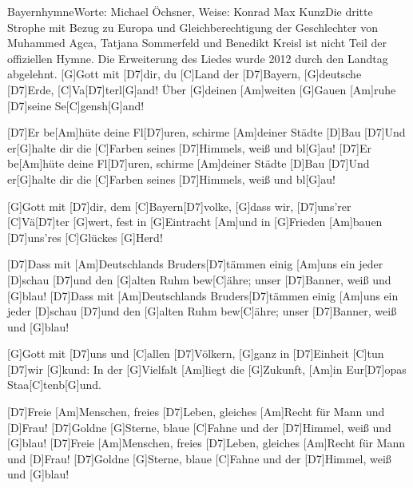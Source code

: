 \documentclass[../main.tex]{subfiles}
\begin{document}
\begin{song}[2]{Bayernhymne}{Worte:  Michael Öchsner, Weise: Konrad Max Kunz}{Die dritte Strophe mit Bezug zu Europa und Gleichberechtigung der Geschlechter von Muhammed Agca, Tatjana Sommerfeld und Benedikt Kreisl ist nicht Teil der offiziellen Hymne. Die Erweiterung des Liedes wurde 2012 durch den Landtag abgelehnt.}
[G]Gott mit [D7]dir, du [C]Land der [D7]Bayern, [G]deutsche [D7]Erde, [C]Va[D7]terl[G]and!
Über [G]deinen [Am]weiten [G]Gauen [Am]ruhe [D7]seine Se[C]gensh[G]and!

[D7]Er be[Am]hüte deine Fl[D7]uren, schirme [Am]deiner Städte [D]Bau
[D7]Und er[G]halte dir die [C]Farben seines [D7]Himmels, weiß und bl[G]au!
[D7]Er be[Am]hüte deine Fl[D7]uren, schirme [Am]deiner Städte [D]Bau
[D7]Und er[G]halte dir die [C]Farben seines [D7]Himmels, weiß und bl[G]au!

[G]Gott mit [D7]dir, dem [C]Bayern[D7]volke, [G]dass wir, [D7]uns'rer [C]Vä[D7]ter [G]wert,
fest in [G]Eintracht [Am]und in [G]Frieden [Am]bauen [D7]uns'res [C]Glückes [G]Herd!

[D7]Dass mit [Am]Deutschlands Bruders[D7]tämmen einig [Am]uns ein jeder [D]schau
[D7]und den [G]alten Ruhm bew[C]{ä}hre; unser [D7]Banner, weiß und [G]blau!
[D7]Dass mit [Am]Deutschlands Bruders[D7]tämmen einig [Am]uns ein jeder [D]schau
[D7]und den [G]alten Ruhm bew[C]{ä}hre; unser [D7]Banner, weiß und [G]blau!

[G]Gott mit [D7]uns und [C]allen [D7]Völkern, [G]ganz in [D7]Einheit [C]tun [D7]wir [G]kund:
In der [G]Vielfalt [Am]liegt die [G]Zukunft, [Am]in Eur[D7]opas Staa[C]tenb[G]und.

[D7]Freie [Am]Menschen, freies [D7]Leben, gleiches [Am]Recht für Mann und [D]Frau!
[D7]Goldne [G]Sterne, blaue [C]Fahne und der [D7]Himmel, weiß und [G]blau!
[D7]Freie [Am]Menschen, freies [D7]Leben, gleiches [Am]Recht für Mann und [D]Frau!
[D7]Goldne [G]Sterne, blaue [C]Fahne und der [D7]Himmel, weiß und [G]blau!
\end{song}
\end{document}
